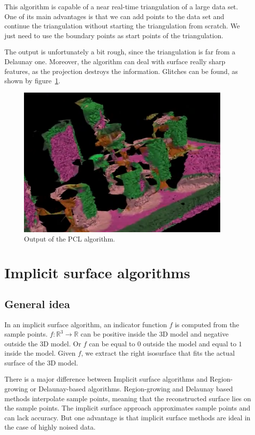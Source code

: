 \documentclass[12pt]{article}
\begin{document}
This algorithm is capable of a near real-time triangulation of a large data set. One of its main advantages is that we can add points to the data set and continue the triangulation without starting the triangulation from scratch. We just need to use the boundary points as start points of the triangulation.

The output is unfortunately a bit rough, since the triangulation is far from a Delaunay one. Moreover, the algorithm can deal with surface really sharp features, as the projection destroys the information. Glitches can be found, as shown by figure~\ref{pclss}.

\begin{figure}[h]
  \centering
  \includegraphics[scale=0.5]{pcloutput.png}
  \caption{\label{pclss} Output of the PCL algorithm.
}
\end{figure}

\newpage

\section{Implicit surface algorithms}
\subsection{General idea}
In an implicit surface algorithm, an indicator function $f$ is computed from the sample points. $f:\mathbb{R}^3 \to \mathbb{R}$ can be positive inside the 3D model and negative outside the 3D model. Or $f$ can be equal to $0$ outside the model and equal to $1$ inside the model. Given $f$, we extract the right isosurface that fits the actual surface of the 3D model.

There is a major difference between Implicit surface algorithms and Region-growing or Delaunay-based algorithms. Region-growing and Delaunay based methods interpolate sample points, meaning that the reconstructed surface lies on the sample points. The implicit surface approach approximates sample points and can lack accuracy. But one advantage is that implicit surface methods are ideal in the case of highly noised data.
\end{document}
